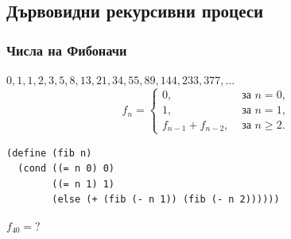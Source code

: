 \documentclass[alsotrans]{beamerswitch}
\begin{document}
\subsection{Дървовидни рекурсивни процеси}

\begin{frame}[fragile]
  \frametitle{Числа на Фибоначи}

  $0, 1, 1, 2, 3, 5, 8, 13, 21, 34, 55, 89, 144, 233, 377, \ldots$\\
  \pause
  \begin{equation*}
    f_n =
    \begin{cases}
      0, &\text{ за }n = 0,\\
      1, &\text{ за }n = 1,\\
      f_{n-1} + f_{n-2}, &\text{ за }n \geq 2.
    \end{cases}
  \end{equation*}
  \pause
\begin{lstlisting}
(define (fib n)
  (cond ((= n 0) 0)
        ((= n 1) 1)
        (else (+ (fib (- n 1)) (fib (- n 2))))))
\end{lstlisting}
  \pause
  $f_{40} = ?$
\end{frame}
\end{document}
